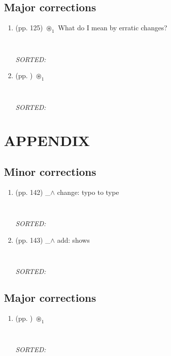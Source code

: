\documentclass[12pt]{article}
\begin{document}
\subsection{Major corrections}
\begin{enumerate}

\item  (pp. 125) $\circledast_1$ 
	What do I mean by erratic changes?
	\begin{verbatim}
	
	\end{verbatim}
	\textit{
	SORTED:  
	}
	\\

\item  (pp. ) $\circledast_1$ 
	
	\begin{verbatim}
	
	\end{verbatim}
	\textit{
	SORTED:  
	}
	\\


\end{enumerate}

\section{APPENDIX}

\subsection{Minor corrections}
\begin{enumerate}

\item  (pp. 142)  \_$\wedge$  
	change:	typo to type
	\begin{verbatim}
	
	\end{verbatim}
	\textit{
	SORTED:  
	}
	\\

\item  (pp. 143)  \_$\wedge$  
	add: shows
	\begin{verbatim}
	
	\end{verbatim}
	\textit{
	SORTED:  
	}
	\\



\end{enumerate}


\subsection{Major corrections}
\begin{enumerate}

\item  (pp. ) $\circledast_1$ 
	
	\begin{verbatim}
	
	\end{verbatim}
	\textit{
	SORTED:  
	}
	\\


\end{enumerate}
\end{document}
